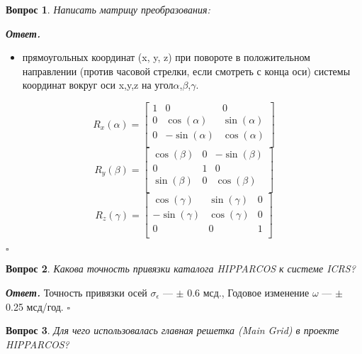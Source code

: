 \documentclass[12pt]{article}
\newtheorem{problem}{Вопрос}
\newenvironment{solution}[1][\it{Ответ}]{\textbf{#1. } }{$\square$}
\begin{document}
	
	
	\begin{problem}
		Написать матрицу преобразования:
	\end{problem}
	
	\begin{solution}
		
		\begin{itemize}
			\item прямоугольных координат (x, y, z) при повороте в положительном направлении (против часовой стрелки, если смотреть с конца оси) системы координат вокруг оси x,y,z	
			на угол$\alpha$,$\beta$,$\gamma$.
		\end{itemize}
		
			\[
			R_{x}(\alpha) =
			\left[ {\begin{array}{ccc}
				1	& 0 & 0 \\
				0	& 	\cos(\alpha) & \sin(\alpha) \\
				0	&  -\sin(\alpha) &	\cos(\alpha)\\	
			\end{array} } \right]
			\]
			\[
			R_{y}(\beta) =
			\left[ {\begin{array}{ccc}
						\cos(\beta)	& 0 &- \sin(\beta) \\
					0	& 	1 & 0  \\
					\sin(\beta)	&  0 &		\cos(\beta)\\	
			\end{array} } \right]
			\]
			\[
			R_{z}(\gamma) =
			\left[ {\begin{array}{ccc}
						\cos(\gamma)	& 	\sin(\gamma) & 0 \\
					-\sin(\gamma)	& 	\cos(\gamma) & 0 \\
					0	&0&1 \\	
			\end{array} } \right]
			\]
		
	\end{solution}
	
	
	\begin{problem}
		Какова точность привязки каталога HIPPARCOS к системе ICRS?
	\end{problem}
	
	\begin{solution}
		Точность привязки осей $\sigma_{\epsilon}$ — $\pm$ 0.6 мсд., Годовое изменение $\omega$ — $\pm$ 0.25 мсд/год.
	\end{solution}
	
	\begin{problem}
		Для чего использовалась главная решетка (Main Grid) в проекте HIPPARCOS?
	\end{problem}
	
\end{document}
